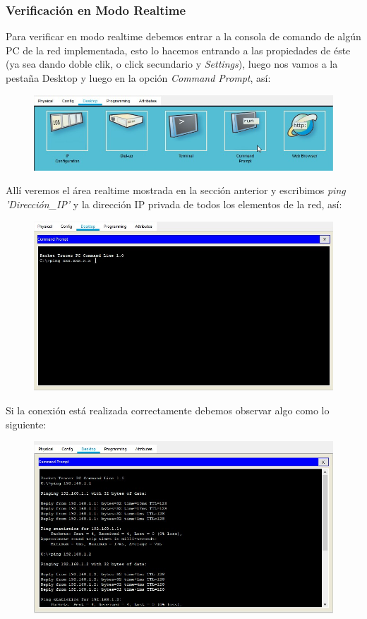 \documentclass[journal]{IEEEtran}
\begin{document}
	\subsubsection{Verificación en Modo Realtime}
	Para verificar en modo realtime debemos entrar a la consola de comando de algún PC de la red implementada, esto lo hacemos entrando a las propiedades de éste (ya sea dando doble clik, o click secundario y \textit{Settings}), luego nos vamos a la pestaña Desktop y luego en la opción \textit{Command Prompt}, así: \newline
	\begin{figure}[ht]
		\centering
		\includegraphics[scale=0.33]{pt_ver_realtime.jpg}
	\end{figure}

	\newpage

	Allí veremos el área realtime mostrada en la sección anterior y escribimos \textit{ping 'Dirección\_IP'} y la dirección IP privada de todos los elementos de la red, así:\newline
	\begin{figure}[ht]
		\centering
		\includegraphics[scale=0.3]{pt_ver_ping1.jpg}
	\end{figure}
	
	Si la conexión está realizada correctamente debemos observar algo como lo siguiente:
	\begin{figure}[ht]
		\centering
		\includegraphics[scale=0.3]{pt_ver_ping2.jpg}
	\end{figure}
\end{document}
